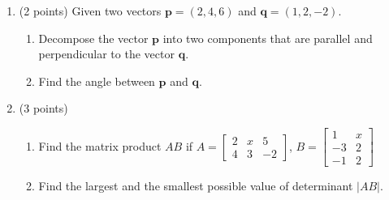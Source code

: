 \documentclass[]{exam}
\begin{document}
\begin{enumerate}
\large 






\item (2 points) Given two vectors $\textbf{p} = (2, 4, 6)$ and $\textbf{q} = (1, 2, -2)$. 

\begin{enumerate}
\item Decompose the vector $\textbf{p}$ into two components that are parallel and perpendicular to the vector $\textbf{q}$.
\item Find the angle between $\textbf{p}$ and $\textbf{q}$.
\end{enumerate}

\item (3 points)
\begin{enumerate}
    \item Find the matrix product $AB$ if $A=\begin{bmatrix}2 & x & 5 \\ 4 & 3 & -2 \end{bmatrix}$, $B=\begin{bmatrix} 1 & x \\ -3 & 2 \\ -1 & 2 \end{bmatrix}$
    \item Find the largest and the smallest possible value of determinant $| AB |$.
\end{enumerate}


\end{enumerate}
\end{document}
